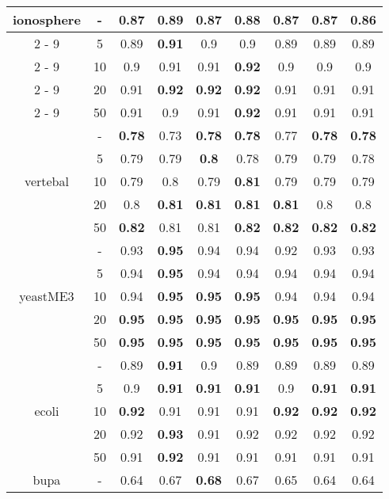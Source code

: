 \documentclass{article}%
\begin{document}
\begin{longtable}{c|c|ccccccc}
\hline%
\multirow{5}{*}{ionosphere}&{-}&0.87&\textbf{0.89}&0.87&0.88&0.87&0.87&0.86\\%
\cline{2%
-%
9}%
&5&0.89&\textbf{0.91}&0.9&0.9&0.89&0.89&0.89\\%
\cline{2%
-%
9}%
&10&0.9&0.91&0.91&\textbf{0.92}&0.9&0.9&0.9\\%
\cline{2%
-%
9}%
&20&0.91&\textbf{0.92}&\textbf{0.92}&\textbf{0.92}&0.91&0.91&0.91\\%
\cline{2%
-%
9}%
&50&0.91&0.9&0.91&\textbf{0.92}&0.91&0.91&0.91\\%
\hline%
\multirow{5}{*}{vertebal}&{-}&\textbf{0.78}&0.73&\textbf{0.78}&\textbf{0.78}&0.77&\textbf{0.78}&\textbf{0.78}\\%
\cline{2%
-%
9}%
&5&0.79&0.79&\textbf{0.8}&0.78&0.79&0.79&0.78\\%
\cline{2%
-%
9}%
&10&0.79&0.8&0.79&\textbf{0.81}&0.79&0.79&0.79\\%
\cline{2%
-%
9}%
&20&0.8&\textbf{0.81}&\textbf{0.81}&\textbf{0.81}&\textbf{0.81}&0.8&0.8\\%
\cline{2%
-%
9}%
&50&\textbf{0.82}&0.81&0.81&\textbf{0.82}&\textbf{0.82}&\textbf{0.82}&\textbf{0.82}\\%
\hline%
\multirow{5}{*}{yeastME3}&{-}&0.93&\textbf{0.95}&0.94&0.94&0.92&0.93&0.93\\%
\cline{2%
-%
9}%
&5&0.94&\textbf{0.95}&0.94&0.94&0.94&0.94&0.94\\%
\cline{2%
-%
9}%
&10&0.94&\textbf{0.95}&\textbf{0.95}&\textbf{0.95}&0.94&0.94&0.94\\%
\cline{2%
-%
9}%
&20&\textbf{0.95}&\textbf{0.95}&\textbf{0.95}&\textbf{0.95}&\textbf{0.95}&\textbf{0.95}&\textbf{0.95}\\%
\cline{2%
-%
9}%
&50&\textbf{0.95}&\textbf{0.95}&\textbf{0.95}&\textbf{0.95}&\textbf{0.95}&\textbf{0.95}&\textbf{0.95}\\%
\hline%
\multirow{5}{*}{ecoli}&{-}&0.89&\textbf{0.91}&0.9&0.89&0.89&0.89&0.89\\%
\cline{2%
-%
9}%
&5&0.9&\textbf{0.91}&\textbf{0.91}&\textbf{0.91}&0.9&\textbf{0.91}&\textbf{0.91}\\%
\cline{2%
-%
9}%
&10&\textbf{0.92}&0.91&0.91&0.91&\textbf{0.92}&\textbf{0.92}&\textbf{0.92}\\%
\cline{2%
-%
9}%
&20&0.92&\textbf{0.93}&0.91&0.92&0.92&0.92&0.92\\%
\cline{2%
-%
9}%
&50&0.91&\textbf{0.92}&0.91&0.91&0.91&0.91&0.91\\%
\hline%
\multirow{5}{*}{bupa}&{-}&0.64&0.67&\textbf{0.68}&0.67&0.65&0.64&0.64\\%

\end{longtable}
\end{document}
